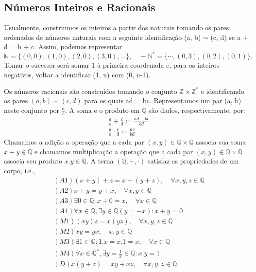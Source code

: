 \documentclass[analysis_notes.tex]{subfiles}
\begin{document}
\subsection{N\'umeros Inteiros e Racionais}
Usualmente, construimos os inteiros a partir dos naturais tomando os pares ordenados de n\'umeros naturais
com a seguinte identifica\c c\~ao (a, b) $\mathtt{\sim}$ (c, d) se a + d = b + c. Assim, podemos representar
$$
	\mathbb{N} = \{(0, 0), (1, 0), (2, 0), (3, 0), \ldots\}, \quad -\mathbb{N}^* = \{\cdots, (0, 3), (0, 2), (0, 1)\}.
$$
Tomar o sucessor ser\'a somar 1 \`a primeira coordenada e, para os inteiros negativos, voltar a identificar (1, n) com (0, n-1).

Os n\'umeros racionais s\~ao constru\'idos tomando o conjunto $\mathbb{Z}\times{\mathbb{Z}^*}$ e identificando os pares $(a, b)\mathtt{\sim}(c, d)$
para os quais ad = bc. Representamos um par (a, b) neste conjunto por $\displaystyle \frac{a}{b}.$ A soma e o produto em $\mathbb{Q}$
s\~ao dados, respectivamente, por:
\begin{align*}
	 & \frac{a}{b} + \frac{c}{d} \coloneqq \frac{ad + bc}{bd} \\
	 & \frac{a}{b}\cdot\frac{c}{d} \coloneqq \frac{ac}{bd}.
\end{align*}
Chamamos a adi\c c\~ao a opera\c c\~ao que a cada par $(x, y)\in \mathbb{Q}\times{\mathbb{Q}}$ associa sua soma $x+y\in \mathbb{Q}$
e chamamos multiplica\c c\~ao a opera\c c\~ao que a cada par $(x, y)\in \mathbb{Q}\times \mathbb{Q}$ associa seu produto $x.y\in \mathbb{Q}.$
A terna $(\mathbb{Q}, +, \cdot)$ satisfaz as propriedades de um corpo, i.e.,
\begin{align*}
	 & (A1) (x + y) + z = x + (y + z), \quad\forall x, y, z\in \mathbb{Q}             \\
	 & (A2) x + y = y + x, \quad\forall x, y\in \mathbb{Q}                            \\
	 & (A3) \exists 0\in \mathbb{Q}: x + 0 = x, \quad\forall x\in \mathbb{Q}          \\
	 & (A4) \forall x\in \mathbb{Q}, \exists y\in \mathbb{Q} (y = -x): x + y = 0      \\
	 & (M1) (xy)z = x(yz), \quad\forall x, y, z\in \mathbb{Q}                         \\
	 & (M2) xy = yx, \quad x, y\in \mathbb{Q}                                         \\
	 & (M3) \exists 1\in \mathbb{Q}: 1.x = x.1 = x, \quad\forall x\in \mathbb{Q}      \\
	 & (M4) \forall x\in \mathbb{Q}^*, \exists y = \frac{1}{x}\in \mathbb{Q}: x.y = 1 \\
	 & (D) x(y+z) = xy + xz,\quad\forall x, y, z\in \mathbb{Q}.
\end{align*}
\end{document}
